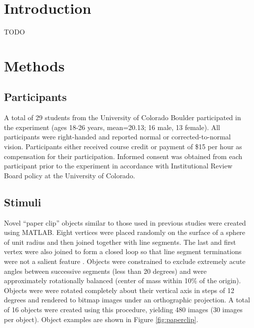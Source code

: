 \documentclass[defaultstyle,12pt]{article}
\begin{document}
\section{Introduction}
TODO

\section{Methods}

\subsection{Participants}
A total of 29 students from the University of Colorado Boulder participated in the experiment (ages 18-26 years, mean=20.13; 16 male, 13 female). All participants were right-handed and reported normal or corrected-to-normal vision. Participants either received course credit or payment of \$15 per hour as compensation for their participation. Informed consent was obtained from each participant prior to the experiment in accordance with Institutional Review Board policy at the University of Colorado.

\subsection{Stimuli}
Novel ``paper clip'' objects similar to those used in previous studies \cite{BulthoffEdelman92,EdelmanBulthoff92,LogothetisPaulsBulthoffEtAl94,LogothetisPaulsPoggio95,SinhaPoggio96} were created using MATLAB. Eight vertices were placed randomly on the surface of a sphere of unit radius and then joined together with line segments. The last and first vertex were also joined to form a closed loop so that line segment terminations were not a salient feature \cite{BalasSinha09b}. Objects were constrained to exclude extremely acute angles between successive segments (less than 20 degrees) and were approximately rotationally balanced (center of mass within 10\% of the origin). Objects were were rotated completely about their vertical axis in steps of 12 degrees and rendered to bitmap images under an orthographic projection. A total of 16 objects were created using this procedure, yielding 480 images (30 images per object). Object examples are shown in Figure \ref{fig:paperclip}.
\end{document}
